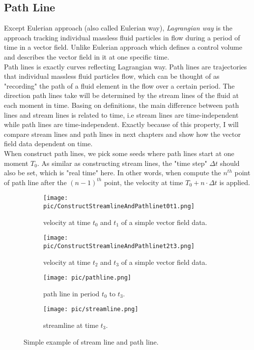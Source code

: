 \documentclass[
     11pt,         %
     a4paper,      %
     oneside,
     ]{article}
\begin{document}
	\subsection{Path Line}
	Except Eulerian approach (also called Eulerian way), \textit{Lagrangian way} is the approach tracking individual massless fluid particles in flow during a period of time in a vector field. Unlike Eulerian approach which defines a control volume and describes the vector field in it at one specific time.\\
	Path lines is exactly curves reflecting Lagrangian way. Path lines are trajectories that individual massless fluid particles flow, which can be thought of as "recording" the path of a fluid element in the flow over a certain period. The direction path lines take will be determined by the stream lines of the fluid at each moment in time\cite{PathlineDefine}. Basing on definitions, the main difference between path lines and stream lines is related to time, i.e stream lines are time-independent while path lines are time-independent. Exactly because of this property, I will compare stream lines and path lines in next chapters and show how the vector field data dependent on time.\\
	When construct path lines, we pick some seeds where path lines start at one moment $T_{0}$. As similar as constructing stream lines, the "time step" $\Delta t$ should also be set, which is "real time" here. In other words, when compute the $n^{th}$ point of path line after the $(n-1)^{th}$ point, the velocity at time $T_{0}+n\cdot\Delta t$ is applied.\\
	 \begin{figure}[H]
	 	\begin{subfigure}{0.45\textwidth}
	 		\centering
	 		\texttt{[image: pic/ConstructStreamlineAndPathlinet0t1.png]}
	 		\caption{{\tiny velocity at time $t_{0}$ and $t_{1}$ of a simple vector field data.}}
	 		\label{fig:ConstructStreamlineAndPathlinet0t1}
	 	\end{subfigure}
	 	\begin{subfigure}{0.45\textwidth}
	         \centering
	 		 \texttt{[image: pic/ConstructStreamlineAndPathlinet2t3.png]}
	 		 \caption{{\tiny velocity at time $t_{2}$ and $t_{3}$ of a simple vector field data.}}
	 		 \label{fig:ConstructStreamlineAndPathlinet2t3}
	 	\end{subfigure}
	 	\begin{subfigure}{0.45\textwidth}
	 		 \centering
	 		 \texttt{[image: pic/pathline.png]}
	 		 \caption{{\tiny path line in period $t_{0}$ to $t_{3}$.}}
	 		 \label{fig:pathline}
	 	\end{subfigure}
	 	\begin{subfigure}{0.45\textwidth}
	    	 \centering
	 		 \texttt{[image: pic/streamline.png]}
	 		 \caption{{\tiny streamline at time $t_{3}$.}}
	 		 \label{fig:streamline}
	 \end{subfigure}
	 \caption{{\tiny Simple example of stream line and path line.}}
	 \label{fig:streamlineandpathline}
	 \end{figure}
\end{document}
